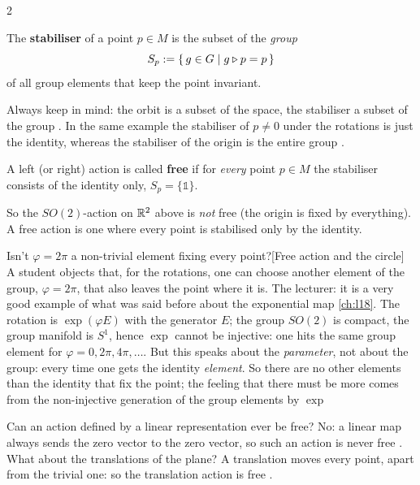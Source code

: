 \begin{paracol}{2}
\begin{definition}\label{def:pb-stabiliser}
The \textbf{stabiliser} of a point $p\in M$ is the subset of the \emph{group}
\[
  S_p:=\{\,g\in G\mid g\mathbin{\triangleright} p=p\,\}
\]
of all group elements that keep the point invariant.   
\end{definition}
Always keep in mind: the orbit is a subset of the space, the stabiliser a subset of the group . In the same example the stabiliser of $p\ne0$ under the rotations is just the identity, whereas the stabiliser of the origin is the entire group   .

\begin{definition}\label{def:pb-free}
A left (or right) action is called \textbf{free} if for \emph{every} point $p\in M$ the stabiliser consists of the identity only, $S_p=\{\mathbb 1\}$.   
\end{definition}
So the $SO(2)$-action on $\mathbb{R}^2$ above is \emph{not} free (the origin is fixed by everything). A free action is one where every point is stabilised only by the identity.
\begin{answer}{Isn't $\varphi=2\pi$ a non-trivial element fixing every point?}[Free action and the circle]
A student objects that, for the rotations, one can choose another element of the group, $\varphi=2\pi$, that also leaves the point where it is. The lecturer: it is a very good example of what was said before about the exponential map \cref{ch:l18}. The rotation is $\exp(\varphi E)$ with the generator $E$; the group $SO(2)$ is compact, the group manifold is $S^1$, hence $\exp$ cannot be injective: one hits the same group element for $\varphi=0,2\pi,4\pi,\dots$. But this speaks about the \emph{parameter}, not about the group: every time one gets the identity \emph{element}. So there are no other elements than the identity that fix the point; the feeling that there must be more comes from the non-injective generation of the group elements by $\exp$       
\end{answer}
Can an action defined by a linear representation ever be free? No: a linear map always sends the zero vector to the zero vector, so such an action is never free  . What about the translations of the plane? A translation moves every point, apart from the trivial one: so the translation action is free   .


\end{paracol}
